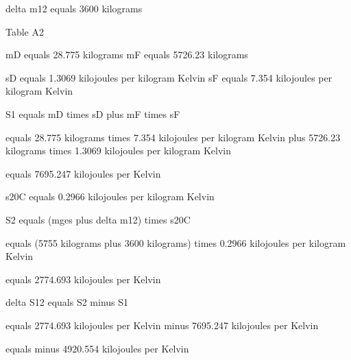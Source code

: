 delta m12 equals 3600 kilograms  

Table A2  

mD equals 28.775 kilograms  
mF equals 5726.23 kilograms  

sD equals 1.3069 kilojoules per kilogram Kelvin  
sF equals 7.354 kilojoules per kilogram Kelvin  

S1 equals mD times sD plus mF times sF  

equals 28.775 kilograms times 7.354 kilojoules per kilogram Kelvin plus 5726.23 kilograms times 1.3069 kilojoules per kilogram Kelvin  

equals 7695.247 kilojoules per Kelvin  

s20C equals 0.2966 kilojoules per kilogram Kelvin  

S2 equals (mges plus delta m12) times s20C  

equals (5755 kilograms plus 3600 kilograms) times 0.2966 kilojoules per kilogram Kelvin  

equals 2774.693 kilojoules per Kelvin  

delta S12 equals S2 minus S1  

equals 2774.693 kilojoules per Kelvin minus 7695.247 kilojoules per Kelvin  

equals minus 4920.554 kilojoules per Kelvin